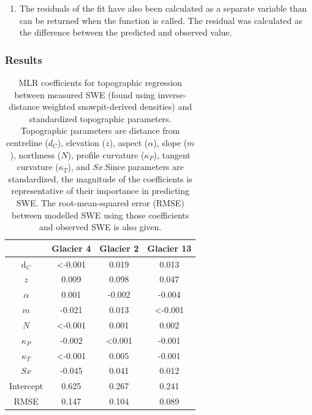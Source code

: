 \documentclass[12pt]{article}
\newcommand{\params}{Topographic parameters are distance from centreline ($d_C$), elevation ($z$), aspect ($\alpha$), slope ($m$), northness ($N$), profile curvature ($\kappa_P$), tangent curvature ($\kappa_T$), and $Sx$.}
\begin{document}
\begin{enumerate}
\item The residuals of the fit have also been calculated as a separate variable than can be returned when the function is called. The residual was calculated as the difference between the predicted and observed value. 
\end{enumerate}


\subsubsection{Results}

\begin{table}
\centering
\caption{MLR coefficients for topographic regression between measured SWE (found using inverse-distance weighted snowpit-derived densities) and standardized topographic parameters. \params Since parameters are standardized, the magnitude of the coefficients is representative of their importance in predicting SWE. The root-mean-squared error (RMSE) between modelled SWE using those coefficients and observed SWE is also given.}
\label{tab:MLRcoeff}
\begin{tabular}{cccc}
 & \textbf{Glacier 4} & \textbf{Glacier 2} & \textbf{Glacier 13} \\ \hline
d$_C$ 			&  \textless-0.001		& 0.019 					& 0.013 \\
$z$ 				& 0.009 						& 0.098					& 0.047 \\
$\alpha$ 		& 0.001 						& -0.002 					& -0.004 \\
$m$ 			& -0.021 						& 0.013					 &  \textless-0.001 \\
$N$ 				& \textless-0.001		  	& 0.001 					& 0.002 \\
$\kappa_P$ & -0.002 						& \textless0.001 		& -0.001 \\
$\kappa_T$ & \textless-0.001 		& 0.005 					& -0.001 \\
$Sx$ 			& -0.045 						& 0.041 					&0.012 \\
Intercept 		& 0.625 						& 0.267 					& 0.241 \\ \hline
RMSE 			& 0.147						& 0.104 					& 0.089
\end{tabular}
\end{table}
\end{document}
